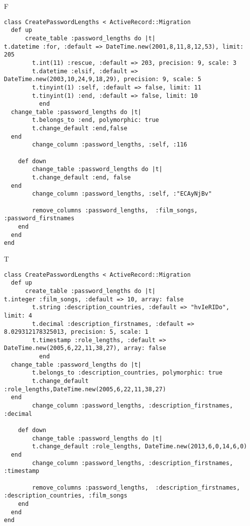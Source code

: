 F
\begin{verbatim}
class CreatePasswordLengths < ActiveRecord::Migration
  def up
	  create_table :password_lengths do |t|
t.datetime :for, :default => DateTime.new(2001,8,11,8,12,53), limit: 205
		t.int(11) :rescue, :default => 203, precision: 9, scale: 3
		t.datetime :elsif, :default => DateTime.new(2003,10,24,9,18,29), precision: 9, scale: 5
		t.tinyint(1) :self, :default => false, limit: 11
		t.tinyint(1) :end, :default => false, limit: 10
		  end
  change_table :password_lengths do |t|
		t.belongs_to :end, polymorphic: true
 		t.change_default :end,false
  end
 		change_column :password_lengths, :self, :116
   
	def down
		change_table :password_lengths do |t|
		t.change_default :end, false
  end
 		change_column :password_lengths, :self, :"ECAyNjBv"
   
		remove_columns :password_lengths,  :film_songs, :password_firstnames 
    end 
  end
end

\end{verbatim}

T
\begin{verbatim}
class CreatePasswordLengths < ActiveRecord::Migration
  def up
	  create_table :password_lengths do |t|
t.integer :film_songs, :default => 10, array: false
		t.string :description_countries, :default => "hvIeRIDo", limit: 4
		t.decimal :description_firstnames, :default => 8.029312178325013, precision: 5, scale: 1
		t.timestamp :role_lengths, :default => DateTime.new(2005,6,22,11,38,27), array: false
		  end
  change_table :password_lengths do |t|
		t.belongs_to :description_countries, polymorphic: true
 		t.change_default :role_lengths,DateTime.new(2005,6,22,11,38,27)
  end
 		change_column :password_lengths, :description_firstnames, :decimal
   
	def down
		change_table :password_lengths do |t|
		t.change_default :role_lengths, DateTime.new(2013,6,0,14,6,0)
  end
 		change_column :password_lengths, :description_firstnames, :timestamp
   
		remove_columns :password_lengths,  :description_firstnames, :description_countries, :film_songs 
    end 
  end
end

\end{verbatim}

